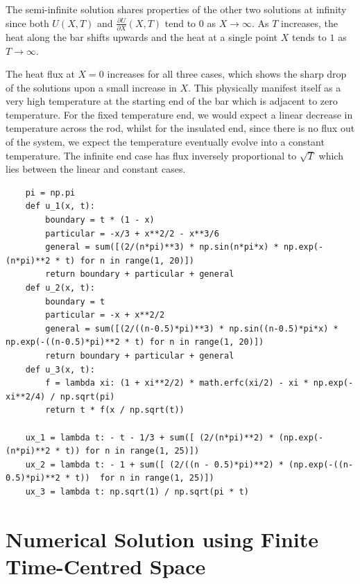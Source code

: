 \documentclass{article}
\newcommand{\pder}[2][]{\frac{\partial#1}{\partial#2}}
\begin{document}
The semi-infinite solution shares properties of the other two solutions at infinity since both \(U(X,T)\) and \(\pder[U]{X}(X,T)\) tend to \(0\) as \(X \to \infty\). As \(T\) increases, the heat along the bar shifts upwards and the heat at a single point \(X\) tends to \(1\) as \(T \to \infty\).

The heat flux at \(X = 0\) increases for all three cases, which shows the sharp drop of the solutions upon a small increase in \(X\). This physically manifest itself as a very high temperature at the starting end of the bar which is adjacent to zero temperature. For the fixed temperature end, we would expect a linear decrease in temperature across the rod, whilst for the insulated end, since there is no flux out of the system, we expect the temperature eventually evolve into a constant temperature. The infinite end case has flux inversely proportional to \(\sqrt{T}\) which lies between the linear and constant cases.

\begin{verbatim}
    pi = np.pi
    def u_1(x, t):
        boundary = t * (1 - x)
        particular = -x/3 + x**2/2 - x**3/6
        general = sum([(2/(n*pi)**3) * np.sin(n*pi*x) * np.exp(-(n*pi)**2 * t) for n in range(1, 20)])
        return boundary + particular + general
    def u_2(x, t):
        boundary = t
        particular = -x + x**2/2
        general = sum([(2/((n-0.5)*pi)**3) * np.sin((n-0.5)*pi*x) * np.exp(-((n-0.5)*pi)**2 * t) for n in range(1, 20)])
        return boundary + particular + general
    def u_3(x, t):
        f = lambda xi: (1 + xi**2/2) * math.erfc(xi/2) - xi * np.exp(-xi**2/4) / np.sqrt(pi)
        return t * f(x / np.sqrt(t))

    ux_1 = lambda t: - t - 1/3 + sum([ (2/(n*pi)**2) * (np.exp(-(n*pi)**2 * t)) for n in range(1, 25)])
    ux_2 = lambda t: - 1 + sum([ (2/((n - 0.5)*pi)**2) * (np.exp(-((n-0.5)*pi)**2 * t))  for n in range(1, 25)])
    ux_3 = lambda t: np.sqrt(1) / np.sqrt(pi * t)
\end{verbatim}

\section{Numerical Solution using Finite Time-Centred Space}
\end{document}
